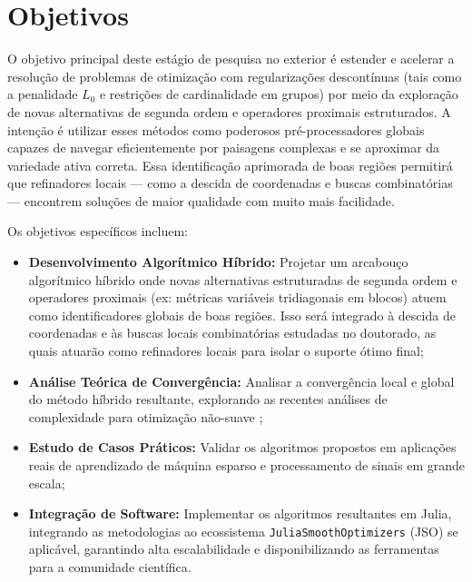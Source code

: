\section{Objetivos}

O objetivo principal deste estágio de pesquisa no exterior é estender e acelerar a resolução de problemas de otimização com regularizações descontínuas (tais como a penalidade $L_0$ e restrições de cardinalidade em grupos) por meio da exploração de novas alternativas de segunda ordem e operadores proximais estruturados. A intenção é utilizar esses métodos como poderosos pré-processadores globais capazes de navegar eficientemente por paisagens complexas e se aproximar da variedade ativa correta. Essa identificação aprimorada de boas regiões permitirá que refinadores locais --- como a descida de coordenadas e buscas combinatórias --- encontrem soluções de maior qualidade com muito mais facilidade.

Os objetivos específicos incluem:
\begin{itemize}
    \item \textbf{Desenvolvimento Algorítmico Híbrido:} Projetar um arcabouço algorítmico híbrido onde novas alternativas estruturadas de segunda ordem e operadores proximais (ex: métricas variáveis tridiagonais em blocos) atuem como identificadores globais de boas regiões. Isso será integrado à descida de coordenadas e às buscas locais combinatórias estudadas no doutorado, as quais atuarão como refinadores locais para isolar o suporte ótimo final;
    \item \textbf{Análise Teórica de Convergência:} Analisar a convergência local e global do método híbrido resultante, explorando as recentes análises de complexidade para otimização não-suave \cite{leconte2023complexity};
    \item \textbf{Estudo de Casos Práticos:} Validar os algoritmos propostos em aplicações reais de aprendizado de máquina esparso e processamento de sinais em grande escala;
    \item \textbf{Integração de Software:} Implementar os algoritmos resultantes em Julia, integrando as metodologias ao ecossistema \texttt{JuliaSmoothOptimizers} (JSO) se aplicável, garantindo alta escalabilidade e disponibilizando as ferramentas para a comunidade científica.
\end{itemize}

